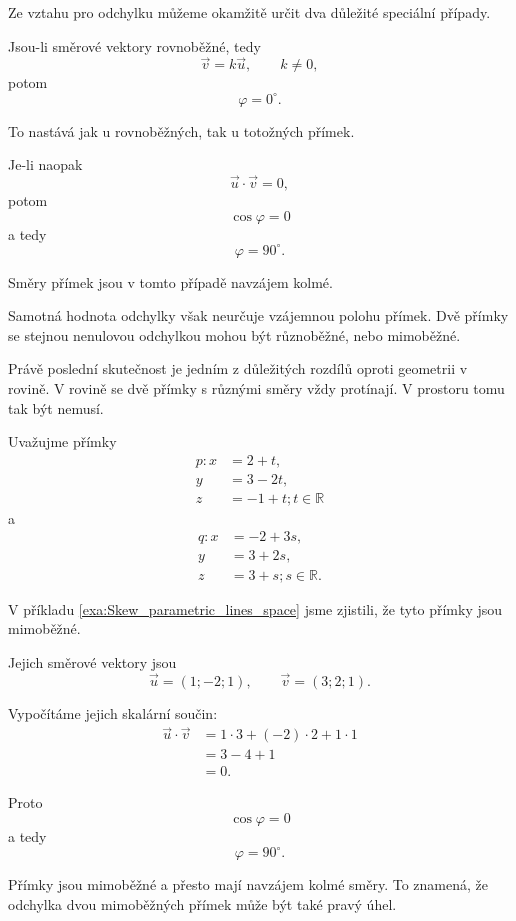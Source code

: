 \begin{remark}
    \label{rem:Special_angles_lines_space}
    Ze vztahu pro odchylku můžeme okamžitě určit dva důležité
    speciální případy.

    Jsou-li směrové vektory rovnoběžné, tedy
    \[
        \vec{v}=k\vec{u},
        \qquad k\neq0,
    \]
    potom
    \[
        \varphi=0^\circ.
    \]

    To nastává jak u rovnoběžných, tak u totožných přímek.

    Je-li naopak
    \[
        \vec{u}\cdot\vec{v}=0,
    \]
    potom
    \[
        \cos\varphi=0
    \]
    a tedy
    \[
        \varphi=90^\circ.
    \]

    Směry přímek jsou v tomto případě navzájem kolmé.

    Samotná hodnota odchylky však neurčuje vzájemnou polohu přímek.
    Dvě přímky se stejnou nenulovou odchylkou mohou být různoběžné,
    nebo mimoběžné.
\end{remark}

Právě poslední skutečnost je jedním z důležitých rozdílů oproti
geometrii v rovině. V rovině se dvě přímky s různými směry vždy
protínají. V prostoru tomu tak být nemusí.

\begin{example}
    \label{exa:Angle_skew_lines_ninety_degrees}

    Uvažujme přímky
    \[
        \begin{aligned}
            p: x&=2+t,\\
            y&=3-2t,\\
            z&=-1+t; t\in\mathbb{R}
        \end{aligned}
    \]
    a
    \[
        \begin{aligned}
            q: x&=-2+3s,\\
            y&=3+2s,\\
            z&=3+s; s\in\mathbb{R}.
        \end{aligned}
    \]

    V příkladu \ref{exa:Skew_parametric_lines_space} jsme zjistili,
    že tyto přímky jsou mimoběžné.

    Jejich směrové vektory jsou
    \[
        \vec{u}=(1;-2;1),
        \qquad
        \vec{v}=(3;2;1).
    \]

    Vypočítáme jejich skalární součin:
    \begin{align*}
        \vec{u}\cdot\vec{v}
        &=
        1\cdot3+(-2)\cdot2+1\cdot1\\
        &=
        3-4+1\\
        &=
        0.
    \end{align*}

    Proto
    \[
        \cos\varphi=0
    \]
    a tedy
    \[
        \varphi=90^\circ.
    \]

    Přímky jsou mimoběžné a přesto mají navzájem kolmé směry.
    To znamená, že odchylka dvou mimoběžných přímek může být také
    pravý úhel.
\end{example}


